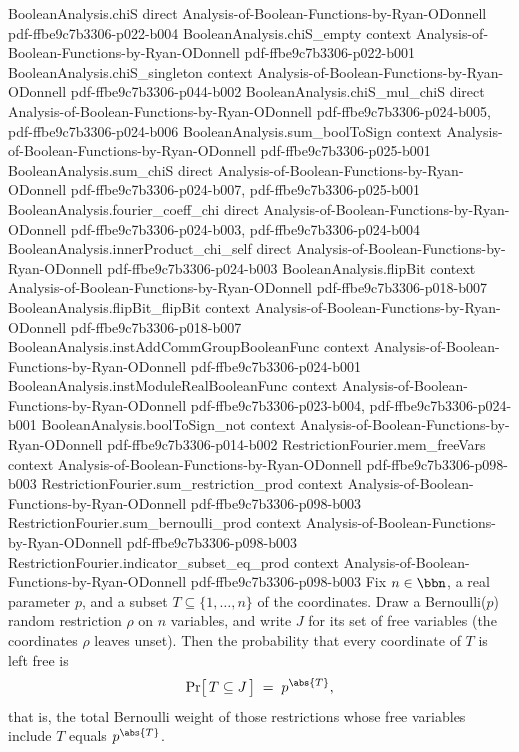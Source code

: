 \begin{theorem}
\proofstep
  {BooleanAnalysis.chiS}
  {direct}
  {Analysis-of-Boolean-Functions-by-Ryan-ODonnell}
  {pdf-ffbe9c7b3306-p022-b004}
\proofstep
  {BooleanAnalysis.chiS_empty}
  {context}
  {Analysis-of-Boolean-Functions-by-Ryan-ODonnell}
  {pdf-ffbe9c7b3306-p022-b001}
\proofstep
  {BooleanAnalysis.chiS_singleton}
  {context}
  {Analysis-of-Boolean-Functions-by-Ryan-ODonnell}
  {pdf-ffbe9c7b3306-p044-b002}
\proofstep
  {BooleanAnalysis.chiS_mul_chiS}
  {direct}
  {Analysis-of-Boolean-Functions-by-Ryan-ODonnell}
  {pdf-ffbe9c7b3306-p024-b005,
    pdf-ffbe9c7b3306-p024-b006}
\proofstep
  {BooleanAnalysis.sum_boolToSign}
  {context}
  {Analysis-of-Boolean-Functions-by-Ryan-ODonnell}
  {pdf-ffbe9c7b3306-p025-b001}
\proofstep
  {BooleanAnalysis.sum_chiS}
  {direct}
  {Analysis-of-Boolean-Functions-by-Ryan-ODonnell}
  {pdf-ffbe9c7b3306-p024-b007,
    pdf-ffbe9c7b3306-p025-b001}
\proofstep
  {BooleanAnalysis.fourier_coeff_chi}
  {direct}
  {Analysis-of-Boolean-Functions-by-Ryan-ODonnell}
  {pdf-ffbe9c7b3306-p024-b003,
    pdf-ffbe9c7b3306-p024-b004}
\proofstep
  {BooleanAnalysis.innerProduct_chi_self}
  {direct}
  {Analysis-of-Boolean-Functions-by-Ryan-ODonnell}
  {pdf-ffbe9c7b3306-p024-b003}
\proofstep
  {BooleanAnalysis.flipBit}
  {context}
  {Analysis-of-Boolean-Functions-by-Ryan-ODonnell}
  {pdf-ffbe9c7b3306-p018-b007}
\proofstep
  {BooleanAnalysis.flipBit_flipBit}
  {context}
  {Analysis-of-Boolean-Functions-by-Ryan-ODonnell}
  {pdf-ffbe9c7b3306-p018-b007}
\proofstep
  {BooleanAnalysis.instAddCommGroupBooleanFunc}
  {context}
  {Analysis-of-Boolean-Functions-by-Ryan-ODonnell}
  {pdf-ffbe9c7b3306-p024-b001}
\proofstep
  {BooleanAnalysis.instModuleRealBooleanFunc}
  {context}
  {Analysis-of-Boolean-Functions-by-Ryan-ODonnell}
  {pdf-ffbe9c7b3306-p023-b004,
    pdf-ffbe9c7b3306-p024-b001}
\proofstep
  {BooleanAnalysis.boolToSign_not}
  {context}
  {Analysis-of-Boolean-Functions-by-Ryan-ODonnell}
  {pdf-ffbe9c7b3306-p014-b002}
\proofstep
  {RestrictionFourier.mem_freeVars}
  {context}
  {Analysis-of-Boolean-Functions-by-Ryan-ODonnell}
  {pdf-ffbe9c7b3306-p098-b003}
\proofstep
  {RestrictionFourier.sum_restriction_prod}
  {context}
  {Analysis-of-Boolean-Functions-by-Ryan-ODonnell}
  {pdf-ffbe9c7b3306-p098-b003}
\proofstep
  {RestrictionFourier.sum_bernoulli_prod}
  {context}
  {Analysis-of-Boolean-Functions-by-Ryan-ODonnell}
  {pdf-ffbe9c7b3306-p098-b003}
\proofstep
  {RestrictionFourier.indicator_subset_eq_prod}
  {context}
  {Analysis-of-Boolean-Functions-by-Ryan-ODonnell}
  {pdf-ffbe9c7b3306-p098-b003}
Fix $n \in \bbn$, a real parameter $p$, and a subset $T \subseteq \{1, \dots, n\}$ of
the coordinates. Draw a Bernoulli($p$) random restriction $\rho$ on $n$ variables, and
write $J$ for its set of free variables (the coordinates $\rho$ leaves unset). Then the
probability that every coordinate of $T$ is left free is
\[
  \Pr\bigl[\,T \subseteq J\,\bigr] \;=\; p^{\abs{T}},
\]
that is, the total Bernoulli weight of those restrictions whose free variables include
$T$ equals $p^{\abs{T}}$.
\end{theorem}

